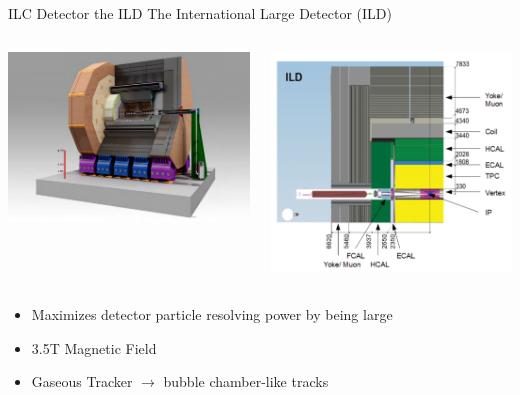 \documentclass[10pt]{beamer}
\begin{document}
\begin{frame}{ILC Detector the ILD }
The International Large Detector (ILD)\\
\begin{columns}
\begin{column}{0.5\textwidth}
\includegraphics[scale=0.14]{ild3d.pdf}
\end{column}
\begin{column}{0.5\textwidth}
\includegraphics[scale=0.2]{ildxsec.pdf}
\end{column}
\end{columns}
\begin{itemize}
\item Maximizes detector particle resolving power by being large
\item 3.5T Magnetic Field
\item Gaseous Tracker $\rightarrow$ bubble chamber-like tracks
\end{itemize}
\end{frame}
\end{document}
